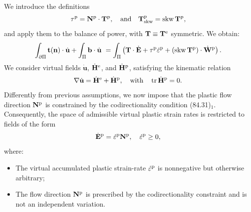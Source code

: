 We introduce the definitions
\[
\tau^{\rm p}= \mathbf{N}^{\rm p}\cdot \mathbf{T}^{\rm p}, \quad \text{and} \quad \mathbf{T}^{\rm p}_{\text{skw}} = \operatorname{skw} \mathbf{T}^{\rm p},
\]
and apply them to the balance of  power,  with \( \mathbf{T} \equiv \mathbf{T}^{\rm e} \) symmetric. We obtain:
\[
\int_{\partial \Pi} \mathbf{t}(\mathbf{n}) \cdot \dot{\mathbf{u}}  + \int_\Pi \mathbf{b} \cdot \dot{\mathbf{u}} \ = \int_\Pi \left( \mathbf{T} \cdot \dot{\mathbf{E}} + \tau^{\rm p}\dot{\varepsilon}^{\rm p}+ \left( \operatorname{skw} \mathbf{T}^{\rm p}\right) \cdot\dot{\mathbf{W}}^{\rm p}\right).
\]
We consider virtual fields \( \dot{\mathbf{u}} \), \( \dot{\mathbf{H}}^{\rm e} \), and \( \dot{\mathbf{H}}^{\rm p} \), satisfying the kinematic relation
\[
\nabla \dot{\mathbf{u}} = \dot{\mathbf{H}}^{\rm e} + \dot{\mathbf{H}}^{\rm p}, \quad \text{with} \quad \operatorname{tr} \dot{\mathbf{H}}^{\rm p} = 0.
\]
Differently from previous assumptions, we now impose that the plastic flow direction \( \mathbf{N}^{\rm p}\) is constrained by the codirectionality condition (84.31)\(_1\). Consequently, the space of admissible virtual plastic strain rates is restricted to fields of the form
\[
\dot{\mathbf{E}}^{\rm p}= \dot{\varepsilon}^{\rm p}\mathbf{N}^{\rm p}, \quad \dot{\varepsilon}^{\rm p}\geq 0,
\]
where:
\begin{itemize}
	\item[(i)] The virtual accumulated plastic strain-rate \( \dot{\varepsilon}^{\rm p}\) is nonnegative but otherwise arbitrary;
	\item[(ii)] The flow direction \( \mathbf{N}^{\rm p}\) is prescribed by the codirectionality constraint and is not an independent variation.
\end{itemize}

